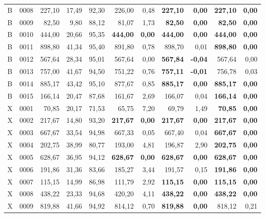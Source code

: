 \begin{longtable}{llrrrrrrrrr}
B & 0008 & 227,10 & 17,49 & 92,30 & 226,00 & 0,48 & \textbf{227,10} & \textbf{0,00} & \textbf{227,10} & \textbf{0,00} \\
B & 0009 & 82,50 & 9,80 & 88,12 & 81,07 & 1,73 & \textbf{82,50} & \textbf{0,00} & \textbf{82,50} & \textbf{0,00} \\
B & 0010 & 444,00 & 20,66 & 95,35 & \textbf{444,00} & \textbf{0,00} & \textbf{444,00} & \textbf{0,00} & \textbf{444,00} & \textbf{0,00} \\
B & 0011 & 898,80 & 41,34 & 95,40 & 891,80 & 0,78 & 898,70 & 0,01 & \textbf{898,80} & \textbf{0,00} \\
B & 0012 & 567,64 & 28,34 & 95,01 & 567,64 & 0,00 & \textbf{567,84} & \textbf{-0,04} & 567,64 & 0,00 \\
B & 0013 & 757,00 & 41,67 & 94,50 & 751,22 & 0,76 & \textbf{757,11} & \textbf{-0,01} & 756,78 & 0,03 \\
B & 0014 & 885,17 & 43,42 & 95,10 & 877,67 & 0,85 & \textbf{885,17} & \textbf{0,00} & \textbf{885,17} & \textbf{0,00} \\
B & 0015 & 166,14 & 20,47 & 87,68 & 161,67 & 2,69 & 166,07 & 0,04 & \textbf{166,14} & \textbf{0,00} \\
X & 0001 & 70,85 & 20,17 & 71,53 & 65,75 & 7,20 & 69,79 & 1,49 & \textbf{70,85} & \textbf{0,00} \\
X & 0002 & 217,67 & 14,80 & 93,20 & \textbf{217,67} & \textbf{0,00} & \textbf{217,67} & \textbf{0,00} & \textbf{217,67} & \textbf{0,00} \\
X & 0003 & 667,67 & 33,54 & 94,98 & 667,33 & 0,05 & 667,40 & 0,04 & \textbf{667,67} & \textbf{0,00} \\
X & 0004 & 202,75 & 38,99 & 80,77 & 193,00 & 4,81 & 196,87 & 2,90 & \textbf{202,75} & \textbf{0,00} \\
X & 0005 & 628,67 & 36,95 & 94,12 & \textbf{628,67} & \textbf{0,00} & \textbf{628,67} & \textbf{0,00} & \textbf{628,67} & \textbf{0,00} \\
X & 0006 & 191,86 & 31,36 & 83,66 & 185,27 & 3,44 & 191,57 & 0,15 & \textbf{191,86} & \textbf{0,00} \\
X & 0007 & 115,15 & 14,99 & 86,98 & 111,79 & 2,92 & \textbf{115,15} & \textbf{0,00} & \textbf{115,15} & \textbf{0,00} \\
X & 0008 & 438,22 & 23,33 & 94,68 & 420,20 & 4,11 & \textbf{438,22} & \textbf{0,00} & \textbf{438,22} & \textbf{0,00} \\
X & 0009 & 819,88 & 41,66 & 94,92 & 814,12 & 0,70 & \textbf{819,88} & \textbf{0,00} & 818,12 & 0,21 \\

\end{longtable}

